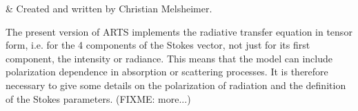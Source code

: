%
%
 \label{sec:polarization}

%
%
 & Created and written by Christian Melsheimer.\\
\stophistory


%
%


\newcommand{\half} {\ensuremath{\textstyle\frac{1}{2}}}
\newcommand{\eVrt} {\ensuremath{\VctStl{e}_v}}
\newcommand{\eHor} {\ensuremath{\VctStl{e}_h}}
\newcommand{\eLh} {\ensuremath{\VctStl{e}_{LH}}}
\newcommand{\eRh} {\ensuremath{\VctStl{e}_{RH}}}
\newcommand{\ePls} {\ensuremath{\VctStl{e}_{+45\degree}}}
\newcommand{\eMin} {\ensuremath{\VctStl{e}_{-45\degree}}}


The present version of ARTS implements the radiative transfer equation
in tensor form, i.e. for the 4 components of the Stokes vector, not
just for its first component, the intensity or radiance.
This means that the model can include polarization dependence in
absorption or scattering processes.
It is therefore necessary to give some details on the polarization of
radiation and the definition of
the Stokes parameters. (FIXME: more...)

\label{sec:polarization:monochrom}


